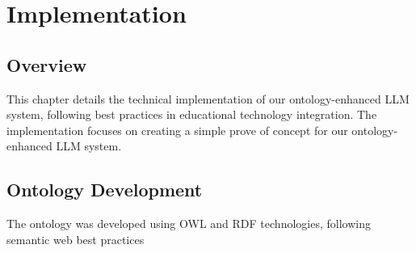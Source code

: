\chapter{Implementation}
\label{chap:implementation}

\section{Overview}
This chapter details the technical implementation of our ontology-enhanced LLM system, following best practices in educational technology integration. The implementation focuses on creating a simple prove of concept for our ontology-enhanced LLM system.

\section{Ontology Development}
\label{sec:ontology-dev}

The ontology was developed using OWL and RDF technologies, following semantic web best practices~

